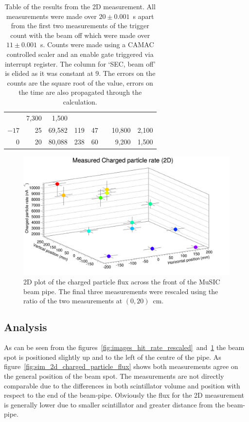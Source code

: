 \begin{table}
\begin{center}
\begin{tabular}{r|r|r|c|c|c|r@{~\(\pm\)~}r}
                                                                                           &   7,300  &  1,500 \\
       \(-17\)  &   25     &           69,582 & 119               &   47        &          &  10,800  &  2,100 \\
         0      &   20     &           80,088 & 238               &   60        &          &   9,200  &  1,500 \\
    \end{tabular}
  \end{center}
  \caption{Table of the results from the 2D measurement. All measurements were made over \( 20\pm0.001 \)~s apart from the first two measurements of the trigger count with the beam off which were made over \( 11\pm0.001 \)~s. Counts were made using a CAMAC controlled scaler and an enable gate triggered via interrupt register. The column for `SEC, beam off' is elided as it was constant at 9. The errors on the counts are the square root of the value, errors on the time are also propagated through the calculation.}
  \label{tab:2d_res}
\end{table}
 
\begin{figure}[hptb]
  \centering
  \includegraphics[width=.9\textwidth]{images/plot_generating_scripts/measured_2d_charged_flux.png}
  \caption{2D plot of the charged particle flux across the front of the MuSIC beam pipe. The final three measurements were rescaled using the ratio of the two measurements at \((0,20)\)~cm.}
  \label{fig:2D_flux}
\end{figure}
 
\subsection{Analysis} %
\label{sec:analysis}
As can be seen from the figures~\ref{fig:images_hit_rate_rescaled}~and~\ref{fig:2D_flux} the beam spot is positioned slightly up and to the left of the centre of the pipe. As figure~\ref{fig:sim_2d_charged_particle_flux} shows both measurements agree on the general position of the beam spot. The measurements are not directly comparable due to the differences in both scintillator volume and position with respect to the end of the beam-pipe. Obviously the flux for the 2D measurement is generally lower due to smaller scintillator and greater distance from the beam-pipe.


